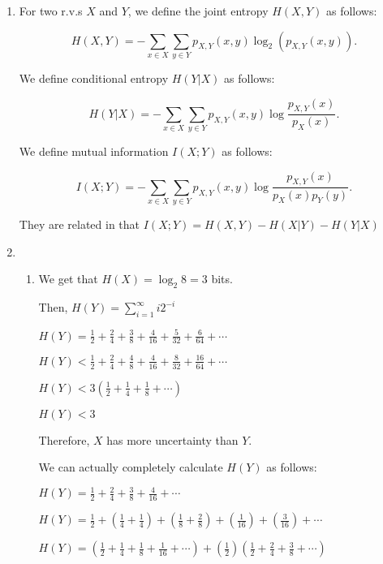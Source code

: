 


\begin{enumerate}
  \item
    For two r.v.s $X$ and $Y$, we define the joint entropy $H(X,Y)$ as follows:

    \[
      H(X,Y) = -\sum_{x \in X} \sum_{y \in Y} p_{X,Y}(x,y) \log_2(p_{X,Y}(x,y))
    .\] 

    We define conditional entropy $H(Y|X)$ as follows:

    \[
      H(Y|X)= -\sum_{x \in X}\sum_{y \in Y} p_{X,Y}(x,y) \log \frac{p_{X,Y}(x)}{p_X(x)}
    .\] 

    We define mutual information $I(X;Y)$ as follows:

    \[
      I(X;Y) = -\sum_{x \in X}\sum_{y \in Y} p_{X,Y}(x,y) \log \frac{p_{X,Y}(x)}{p_X(x)p_Y(y)}
    .\] 

    They are related in that $I(X;Y) = H(X,Y) - H(X|Y) - H(Y|X)$

    \item
      \begin{enumerate}
          \item


            We get that $H(X) = \log_2 8 = 3$ bits.

            Then, $H(Y) = \sum_{i=1}^\infty i2^{-i}$

            $H(Y) = \frac{1}{2} + \frac{2}{4} + \frac{3}{8} + \frac{4}{16} + \frac{5}{32} + \frac{6}{64} + \cdots$

            $H(Y) < \frac{1}{2} + \frac{2}{4} + \frac{4}{8} + \frac{4}{16} + \frac{8}{32} + \frac{16}{64} + \cdots$

            $H(Y) < 3(\frac{1}{2} + \frac{1}{4} + \frac{1}{8} + \cdots)$

            $H(Y) < 3$

            Therefore, $X$ has more uncertainty than $Y$.

            We can actually completely calculate $H(Y)$ as follows:

            $H(Y) = \frac{1}{2} + \frac{2}{4} + \frac{3}{8} + \frac{4}{16} + \cdots$

            $H(Y) = \frac{1}{2} + (\frac{1}{4} + \frac{1}{4}) + (\frac{1}{8} + \frac{2}{8}) + (\frac{1}{16}) + (\frac{3}{16}) + \cdots$


            $H(Y) = (\frac{1}{2} + \frac{1}{4} + \frac{1}{8} + \frac{1}{16} + \cdots) + (\frac{1}{2})(\frac{1}{2} + \frac{2}{4} + \frac{3}{8} + \cdots)$


\end{enumerate}
\end{enumerate}
